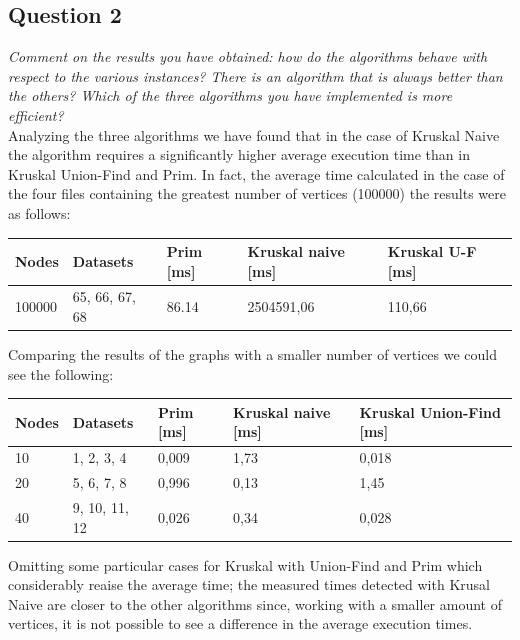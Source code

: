 \subsection{Question 2}
\textit{Comment on the results you have obtained: how do the algorithms behave with respect to the various instances? There is an algorithm that is always better than the others? Which of the three algorithms you have implemented is more efficient?} \\

\noindent
Analyzing the three algorithms we have found that in the case of Kruskal Naive the algorithm requires a significantly higher average execution time than in Kruskal Union-Find and Prim. In fact, the average time calculated in the case of the four files containing the greatest number of vertices (100000) the results were as follows:
\begin{table}[H]\centering
    \begin{tabular}{l|l|l|l|l}
        \textbf{Nodes} & \textbf{Datasets} & \textbf{Prim [ms]} & \textbf{Kruskal naive [ms]} & \textbf{Kruskal U-F [ms]}\\
    \hline
        100000 & 65, 66, 67, 68 & 86.14 & 2504591,06 & 110,66 
    \end{tabular}
\end{table}
\noindent
Comparing the results of the graphs with a smaller number of vertices we could see the following:
\begin{table}[H]\centering
    \begin{tabular}{l|l|l|l|l}
        \textbf{Nodes} & \textbf{Datasets} & \textbf{Prim [ms]} & \textbf{Kruskal naive [ms]} & \textbf{Kruskal Union-Find [ms]} \\
    \hline
        10 & 1, 2, 3, 4     & 0,009  & 1,73  & 0,018  \\
        20 & 5, 6, 7, 8     & 0,996  & 0,13  & 1,45   \\
        40 & 9, 10, 11, 12  & 0,026  & 0,34  & 0,028  \\
    \end{tabular}
\end{table}
\noindent
Omitting some particular cases for Kruskal with Union-Find and Prim which considerably reaise the average time; the measured times detected with Krusal Naive are closer to the other algorithms since, working with a smaller amount of vertices, it is not possible to see a difference in the average execution times.


